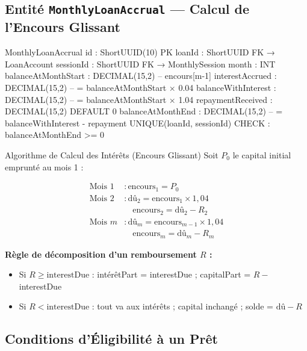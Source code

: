 \documentclass[12pt, a4paper]{report}
\begin{document}
\subsection{Entité \texttt{MonthlyLoanAccrual} — Calcul de l'Encours Glissant}

\begin{codeBox}
MonthlyLoanAccrual {
  id                    : ShortUUID(10)  PK
  loanId                : ShortUUID      FK → LoanAccount
  sessionId             : ShortUUID      FK → MonthlySession
  month                 : INT
  balanceAtMonthStart   : DECIMAL(15,2)  -- encours[m-1]
  interestAccrued       : DECIMAL(15,2)  -- = balanceAtMonthStart × 0.04
  balanceWithInterest   : DECIMAL(15,2)  -- = balanceAtMonthStart × 1.04
  repaymentReceived     : DECIMAL(15,2)  DEFAULT 0
  balanceAtMonthEnd     : DECIMAL(15,2)  -- = balanceWithInterest - repayment
  UNIQUE(loanId, sessionId)
  CHECK : balanceAtMonthEnd >= 0
}
\end{codeBox}

\begin{ruleBox}{Algorithme de Calcul des Intérêts (Encours Glissant)}
Soit $P_0$ le capital initial emprunté au mois 1 :

\begin{align*}
  \text{Mois 1} &: \text{encours}_1 = P_0 \\
  \text{Mois 2} &: \text{dû}_2 = \text{encours}_1 \times 1{,}04 \\
                &\quad \text{encours}_2 = \text{dû}_2 - R_2 \\
  \text{Mois } m &: \text{dû}_m = \text{encours}_{m-1} \times 1{,}04 \\
                 &\quad \text{encours}_m = \text{dû}_m - R_m
\end{align*}

\textbf{Règle de décomposition d'un remboursement $R$ :}
\begin{itemize}
  \item Si $R \geq \text{interestDue}$ : intérêtPart = interestDue ; capitalPart = $R -$ interestDue
  \item Si $R < \text{interestDue}$ : tout va aux intérêts ; capital inchangé ; solde = $\text{dû} - R$
\end{itemize}
\end{ruleBox}

\subsection{Conditions d'Éligibilité à un Prêt}
\end{document}

